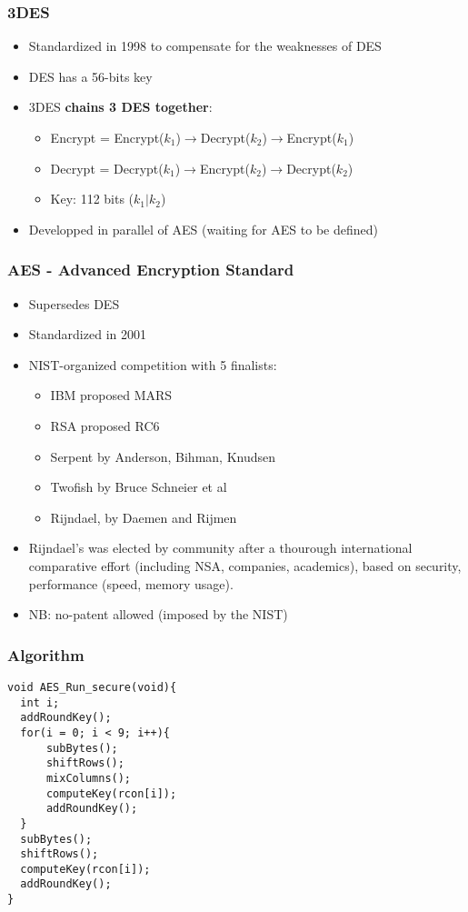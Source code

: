 \documentclass[
hyperref={pdfpagelabels=false}
,xcolor=table
]
{beamer}
\begin{document}
\begin{frame}
  \frametitle{3DES}

  \begin{itemize}
  \item Standardized in 1998 to compensate for the weaknesses of DES
  \item DES has a 56-bits key
  \item 3DES \textbf{chains 3 DES together}:
    \begin{itemize}
    \item Encrypt =  Encrypt($k_1$)$\rightarrow$Decrypt($k_2$)$\rightarrow$Encrypt($k_1$)
    \item Decrypt = Decrypt($k_1$)$\rightarrow$Encrypt($k_2$)$\rightarrow$Decrypt($k_2$)
    \item Key: 112 bits ($k_1|k_2$)
    \end{itemize}
  \item Developped in parallel of AES (waiting for AES to be defined)
  \end{itemize}
 
\end{frame}




\begin{frame}
  \frametitle{AES - Advanced Encryption Standard}
  \begin{itemize}
  \item Supersedes DES
  \item Standardized in 2001
  \item NIST-organized competition with 5 finalists:
    \begin{itemize}
    \item IBM proposed MARS
    \item RSA proposed RC6
    \item Serpent by Anderson, Bihman, Knudsen
    \item Twofish by Bruce Schneier et al
    \item Rijndael, by Daemen and Rijmen
    \end{itemize}
  \item Rijndael's was elected by community after a thourough international comparative effort (including NSA, companies, academics), based on security, performance (speed, memory usage).
  \item NB: no-patent allowed (imposed by the NIST)
  \end{itemize}
\end{frame}


\begin{frame}[fragile]
  \frametitle{Algorithm}
\begin{verbatim}
void AES_Run_secure(void){
  int i;
  addRoundKey();
  for(i = 0; i < 9; i++){
      subBytes();
      shiftRows();
      mixColumns();
      computeKey(rcon[i]);
      addRoundKey();
  }
  subBytes();
  shiftRows();
  computeKey(rcon[i]);
  addRoundKey();
}
\end{verbatim}
\end{frame}
\end{document}
